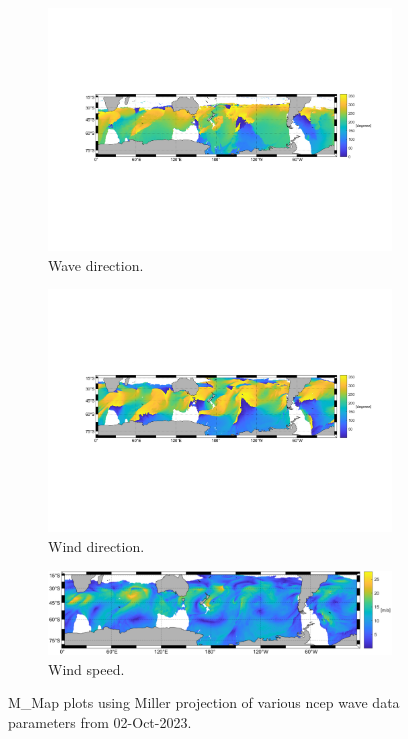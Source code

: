 \begin{figure}[H]
\begin{subfigure}{0.48\linewidth}
        \centering
        \includegraphics[width=\linewidth]{Figures/PipelineValidation/noaamillerdirection.pdf}
        \caption{Wave direction.}
        \label{fig:pipelineVal.waveDataPlot.direction}
    \end{subfigure}
    \begin{subfigure}{0.48\linewidth}
        \centering
        \includegraphics[width=\linewidth]{Figures/PipelineValidation/noaamillerwindDirection.pdf}
        \caption{Wind direction.}
        \label{fig:pipelineVal.waveDataPlot.windDirection}
    \end{subfigure}           
    \begin{subfigure}{0.48\linewidth}
        \centering
        \includegraphics[width=\linewidth]{Figures/PipelineValidation/noaamillerwindSpeed.pdf}
        \caption{Wind speed.}
        \label{fig:pipelineVal.waveDataPlot.windSpeed}
    \end{subfigure}       
    \caption{M\_Map plots using Miller projection of various \acs{ncep} wave data parameters from 02-Oct-2023.}
    \label{fig:pipelineVal.waveDataPlot}
\end{figure}

